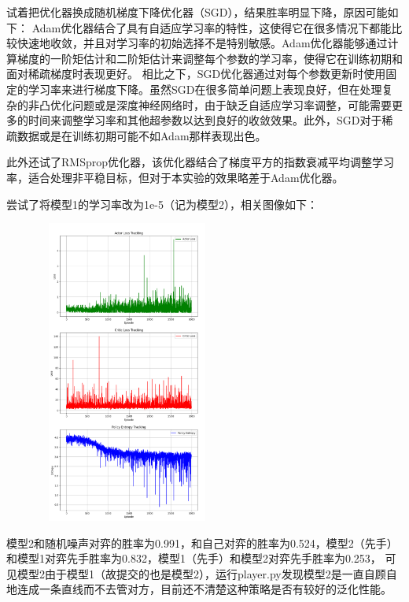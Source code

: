 \documentclass{ctexart}
\begin{document}
		试着把优化器换成随机梯度下降优化器（SGD），结果胜率明显下降，原因可能如下：
	Adam优化器结合了具有自适应学习率的特性，这使得它在很多情况下都能比较快速地收敛，并且对学习率的初始选择不是特别敏感。Adam优化器能够通过计算梯度的一阶矩估计和二阶矩估计来调整每个参数的学习率，使得它在训练初期和面对稀疏梯度时表现更好。
相比之下，SGD优化器通过对每个参数更新时使用固定的学习率来进行梯度下降。虽然SGD在很多简单问题上表现良好，但在处理复杂的非凸优化问题或是深度神经网络时，由于缺乏自适应学习率调整，可能需要更多的时间来调整学习率和其他超参数以达到良好的收敛效果。此外，SGD对于稀疏数据或是在训练初期可能不如Adam那样表现出色。

此外还试了RMSprop优化器，该优化器结合了梯度平方的指数衰减平均调整学习率，适合处理非平稳目标，但对于本实验的效果略差于Adam优化器。

尝试了将模型1的学习率改为1e-5（记为模型2），相关图像如下：
	\begin{figure}[H]
		\centering 
		\includegraphics[height=10cm,width=6cm]{6.png}
		\end{figure}
	模型2和随机噪声对弈的胜率为0.991，和自己对弈的胜率为0.524，模型2（先手）和模型1对弈先手胜率为0.832，模型1（先手）和模型2对弈先手胜率为0.253，
	可见模型2由于模型1（故提交的也是模型2），运行player.py发现模型2是一直自顾自地连成一条直线而不去管对方，目前还不清楚这种策略是否有较好的泛化性能。
\end{document}
